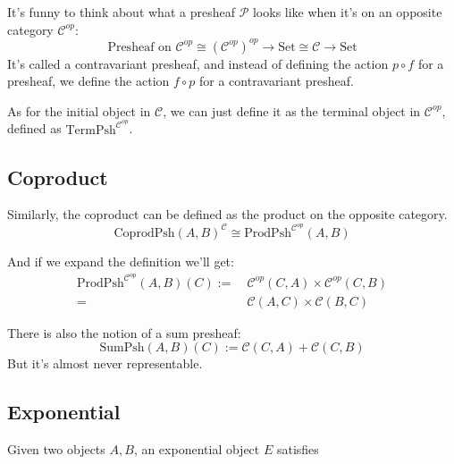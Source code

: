 \documentclass[12pt]{article}
\theoremstyle{definition}
\theoremstyle{remark}
\newcommand{\cat}[1]{\mathcal{#1}}
\newcommand{\psh}[1]{\mathcal{#1}}
\newcommand{\Set}{\mathrm{Set}}
\begin{document}
It's funny to think about what a presheaf $\psh{P}$ looks like when it's on an opposite category $\cat{C}^{op}$:
$$
\text{Presheaf on } \cat{C}^{op} \cong (\cat{C}^{op})^{op} \to \Set \cong \cat{C} \to \Set
$$
It's called a contravariant presheaf, and instead of defining the action $p \circ f$ for a presheaf, we define the action $f \circ p$ for a contravariant presheaf.

As for the initial object in $\cat{C}$, we can just define it as the terminal object in $\cat{C}^{op}$, defined as $\mathrm{TermPsh}^{\cat{C}^{op}}$.

\subsection*{Coproduct}

Similarly, the coproduct can be defined as the product on the opposite category.
$$
\mathrm{CoprodPsh}(A, B)^{\cat{C}} \cong \mathrm{ProdPsh}^{\cat{C}^{op}}(A, B)
$$

And if we expand the definition we'll get:
\begin{align*}
\mathrm{ProdPsh}^{\cat{C}^{op}}(A, B)(C) :=&~\cat{C}^{op}(C, A) \times \cat{C}^{op}(C, B) \\
=&~\cat{C}(A, C) \times \cat{C}(B, C)
\end{align*}

There is also the notion of a sum presheaf:
$$
\mathrm{SumPsh}(A, B)(C) := \cat{C}(C, A) + \cat{C}(C, B)
$$
But it's almost never representable.

\subsection*{Exponential}

Given two objects $A, B$, an exponential object $E$ satisfies
\end{document}
